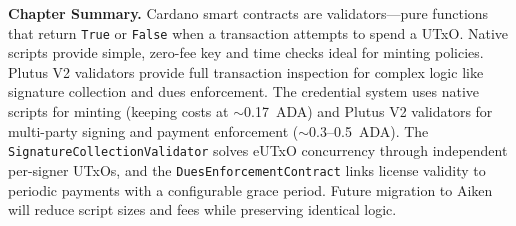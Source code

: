 \noindent\textbf{Chapter Summary.} Cardano smart contracts are
validators---pure functions that return \texttt{True} or \texttt{False}
when a transaction attempts to spend a UTxO. Native scripts provide
simple, zero-fee key and time checks ideal for minting policies. Plutus
V2 validators provide full transaction inspection for complex logic like
signature collection and dues enforcement. The credential system uses
native scripts for minting (keeping costs at ${\sim}$0.17~ADA) and
Plutus V2 validators for multi-party signing and payment enforcement
(${\sim}$0.3--0.5~ADA). The \texttt{SignatureCollectionValidator}
solves eUTxO concurrency through independent per-signer UTxOs, and the
\texttt{DuesEnforcementContract} links license validity to periodic
payments with a configurable grace period. Future migration to Aiken
will reduce script sizes and fees while preserving identical logic.
